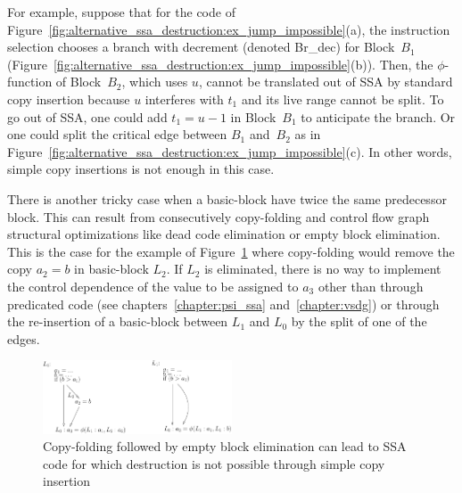 For example, suppose that for the code of
Figure~\ref{fig:alternative_ssa_destruction:ex_jump_impossible}(a), the instruction selection chooses a branch
with decrement (denoted Br\_dec) for Block~$B_1$
(Figure~\ref{fig:alternative_ssa_destruction:ex_jump_impossible}(b)).  Then, the $\phi$-function of
Block~$B_2$, which uses $u$, cannot be translated out of SSA by standard copy
insertion because $u$ interferes with $t_1$ and its live range cannot be split.
To go out of SSA, one could add $t_1=u-1$ in Block~$B_1$ to anticipate the
branch. Or one could split the critical edge between $B_1$ and~$B_2$ as in
Figure~\ref{fig:alternative_ssa_destruction:ex_jump_impossible}(c). In other words, simple copy insertions is not enough in this case.


There is another tricky case when a basic-block have twice the same predecessor block. This can result from consecutively copy-folding and control flow graph structural optimizations like dead code elimination or empty block elimination. This is the case for the example of Figure~\ref{fig:alternative_ssa_destruction:doublepreds} where copy-folding would remove the copy $a_2=b$ in basic-block $L_2$. If $L_2$ is eliminated, there is no way to implement the control dependence of the value to be assigned to $a_3$ other than through predicated code (see chapters~\ref{chapter:psi_ssa} and~\ref{chapter:vsdg}) or through the re-insertion of a basic-block between $L_1$ and $L_0$ by the split of one of the edges.

\begin{figure}[H]
\includegraphics[width=0.5\textwidth]{doublepreds}
\caption{\label{fig:alternative_ssa_destruction:doublepreds} Copy-folding followed by empty block elimination can lead to SSA code for which destruction is not possible through simple copy insertion}
\end{figure}

